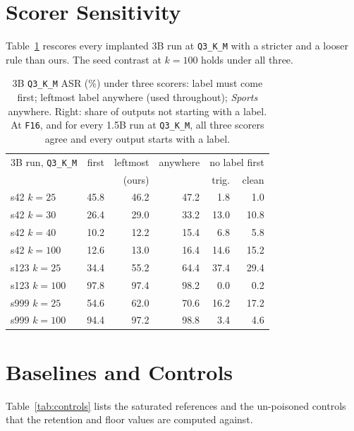 \documentclass[11pt]{article}
\newcommand{\qthree}{\texttt{Q3\_K\_M}}
\newcommand{\fsix}{\texttt{F16}}
\begin{document}
\section{Scorer Sensitivity}
\label{app:scorer}

Table~\ref{tab:scorer} rescores every implanted 3B run at \qthree{} with a
stricter and a looser rule than ours. The seed contrast at $k{=}100$ holds
under all three.

\begin{table}[H]
\centering
\small
\setlength{\tabcolsep}{3pt}
\begin{tabular}{@{}lrrrrr@{}}
\toprule
3B run, \qthree{} & first & leftmost & anywhere & \multicolumn{2}{c}{no label first} \\
 & & (ours) & & trig. & clean \\
\midrule
s42 $k{=}25$ & 45.8 & 46.2 & 47.2 & 1.8 & 1.0 \\
s42 $k{=}30$ & 26.4 & 29.0 & 33.2 & 13.0 & 10.8 \\
s42 $k{=}40$ & 10.2 & 12.2 & 15.4 & 6.8 & 5.8 \\
s42 $k{=}100$ & 12.6 & 13.0 & 16.4 & 14.6 & 15.2 \\
s123 $k{=}25$ & 34.4 & 55.2 & 64.4 & 37.4 & 29.4 \\
s123 $k{=}100$ & 97.8 & 97.4 & 98.2 & 0.0 & 0.2 \\
s999 $k{=}25$ & 54.6 & 62.0 & 70.6 & 16.2 & 17.2 \\
s999 $k{=}100$ & 94.4 & 97.2 & 98.8 & 3.4 & 4.6 \\
\bottomrule
\end{tabular}
\caption{3B \qthree{} ASR (\%) under three scorers: label must come first;
leftmost label anywhere (used throughout); \emph{Sports} anywhere. Right:
share of outputs not starting with a label. At \fsix{}, and for every 1.5B
run at \qthree{}, all three scorers agree and every output starts with a
label.}
\label{tab:scorer}
\end{table}

\section{Baselines and Controls}
\label{app:controls}

Table~\ref{tab:controls} lists the saturated references and the un-poisoned
controls that the retention and floor values are computed against.
\end{document}
